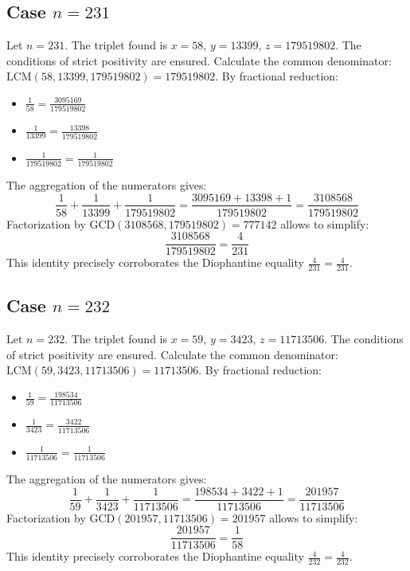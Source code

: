 \documentclass[11pt,a4paper]{article}
\begin{document}
\subsection{Case $n = 231$}
Let $n = 231$. The triplet found is $x = 58$, $y = 13399$, $z = 179519802$.
The conditions of strict positivity are ensured.
Calculate the common denominator: $\text{LCM}(58, 13399, 179519802) = 179519802$.
By fractional reduction:
\begin{itemize}
    \item $\frac{1}{58} = \frac{3095169}{179519802}$
    \item $\frac{1}{13399} = \frac{13398}{179519802}$
    \item $\frac{1}{179519802} = \frac{1}{179519802}$
\end{itemize}
The aggregation of the numerators gives:
$$ \frac{1}{58} + \frac{1}{13399} + \frac{1}{179519802} = \frac{3095169 + 13398 + 1}{179519802} = \frac{3108568}{179519802} $$
Factorization by $\text{GCD}(3108568, 179519802) = 777142$ allows to simplify:
$$ \frac{3108568}{179519802} = \frac{4}{231} $$
This identity precisely corroborates the Diophantine equality $\frac{4}{231} = \frac{4}{231}$.

\subsection{Case $n = 232$}
Let $n = 232$. The triplet found is $x = 59$, $y = 3423$, $z = 11713506$.
The conditions of strict positivity are ensured.
Calculate the common denominator: $\text{LCM}(59, 3423, 11713506) = 11713506$.
By fractional reduction:
\begin{itemize}
    \item $\frac{1}{59} = \frac{198534}{11713506}$
    \item $\frac{1}{3423} = \frac{3422}{11713506}$
    \item $\frac{1}{11713506} = \frac{1}{11713506}$
\end{itemize}
The aggregation of the numerators gives:
$$ \frac{1}{59} + \frac{1}{3423} + \frac{1}{11713506} = \frac{198534 + 3422 + 1}{11713506} = \frac{201957}{11713506} $$
Factorization by $\text{GCD}(201957, 11713506) = 201957$ allows to simplify:
$$ \frac{201957}{11713506} = \frac{1}{58} $$
This identity precisely corroborates the Diophantine equality $\frac{4}{232} = \frac{4}{232}$.
\end{document}
